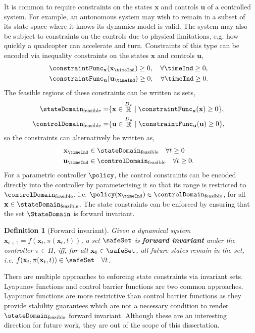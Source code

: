 \documentclass{mimosis-class/mimosis}
\newtheorem{definition}{Definition}[section]
\numberwithin{equation}{chapter}
\DeclareMathOperator{\R}{\mathbb{R}}
\newcommand{\StateDim}{\ensuremath{{D_x}}}
\newcommand{\ControlDim}{\ensuremath{{D_u}}}
\newcommand{\state}{\ensuremath{\mathbf{x}}}
\newcommand{\control}{\ensuremath{\mathbf{u}}}
\begin{document}
It is common to require constraints on the states \(\state\) and controls \(\control\) of a controlled system.
For example, an autonomous system may wish to remain in a subset of its state space where it knows its dynamics model
is valid.
The system may also be subject to constraints on the controls due to physical limitations, e.g.
how quickly a quadcopter can accelerate and turn.
Constraints of this type can be encoded via inequality constraints on the states \(\state\) and controls \(\control\),
\begin{align} \label{eq-}
&\constraintFunc_\state(\state_\timeInd) \geq 0, \quad \forall \timeInd \geq 0, \\
&\constraintFunc_\control(\control_\timeInd) \geq 0, \quad \forall \timeInd \geq 0.
\end{align}
The feasible regions of these constraints can be written as sets,
\begin{align} \label{eq-}
\stateDomain_{\text{feasible}} = &\{ \state \in \R^\StateDim \mid \constraintFunc_\state(\state) \geq 0 \}, \\
\controlDomain_{\text{feasible}} = &\{ \control \in \R^\ControlDim \mid \constraintFunc_\control(\control) \geq 0 \},
\end{align}
so the constraints can alternatively be written as,
\begin{align} \label{eq-}
\state_\timeInd &\in \stateDomain_{\text{feasible}}  \quad \forall t \geq 0 \\
\control_\timeInd &\in \controlDomain_{\text{feasible}} \quad \forall t \geq 0.
\end{align}
For a parametric controller \(\policy\), the control constraints can be encoded directly into the controller by
parameterising it so that its range is restricted to \(\controlDomain_{\text{feasible}}\),
i.e. \(\policy(\state_\timeInd) \in \controlDomain_{\text{feasible}}\),
for all \(\state \in \stateDomain_{\text{feasible}}\).
The state constraints can be enforced by ensuring that the set \(\StateDomain\) is forward invariant.
\begin{definition}[Forward invariant]
Given a dynamical system $\state_{t+1} = f(\state_t, \pi(\state_t, t))$,
a set $\safeSet$ is \textbf{forward invariant} under the controller $\pi \in \Pi$, iff, for all $\state_0 \in \safeSet$,
all future states remain in the set, i.e.  $f(\state_t, \pi(\state_t, t)) \in \safeSet \quad \forall t$.
\end{definition}
There are multiple approaches to enforcing state constraints via invariant sets.
Lyapunov functions \citep{lyapunovGeneral1992a} and control barrier functions \citep{amesControl2019} are two common
approaches.
Lyapunov functions are more restrictive than control barrier functions as they provide stability guarantees
which are not a necessary condition to render \(\stateDomain_{\text{feasible}}\) forward invariant.
Although these are an interesting direction for future work, they are out of the scope of this dissertation.
\end{document}
